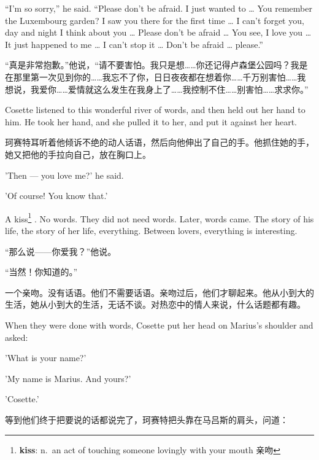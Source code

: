 \documentclass[fontset=ubuntu, zihao=5]{ctexart}
\begin{document}
\begin{paracol}{2}
\switchcolumn*

``I'm so sorry,'' he said. ``Please don't be afraid. I just wanted to \ldots{} You remember the Luxembourg garden? I saw you there for the first time \ldots{} I can't forget you, day and night I think about you \ldots{} Please don't be afraid \ldots{} You see, I love you \ldots{} It just happened to me \ldots{} I can't stop it \ldots{} Don't be afraid \ldots{} please.''

\switchcolumn

“真是非常抱歉。”他说，“请不要害怕。我只是想……你还记得卢森堡公园吗？我是在那里第一次见到你的……我忘不了你，日日夜夜都在想着你……千万别害怕……我想说，我爱你……爱情就这么发生在我身上了……我控制不住……别害怕……求求你。”

\switchcolumn*

Cosette listened to this wonderful river of words, and then held out her hand to him. He took her hand, and she pulled it to her, and put it against her heart.


\switchcolumn

珂赛特耳听着他倾诉不绝的动人话语，然后向他伸出了自己的手。他抓住她的手，她又把他的手拉向自己，放在胸口上。

\switchcolumn*

'Then --- you love me?' he said.

'Of course! You know that.'


A kiss\footnote{\textbf{kiss}: n. an act of touching someone lovingly with
  your mouth 亲吻} . No words. They did not need words. Later, words came.
The story of his life, the story of her life, everything. Between lovers,
everything is interesting.

\switchcolumn

“那么说——你爱我？”他说。

“当然！你知道的。”

一个亲吻。没有话语。他们不需要话语。亲吻过后，他们才聊起来。他从小到大的生活，她从小到大的生活，无话不谈。对热恋中的情人来说，什么话题都有趣。

\switchcolumn*

When they were done with words, Cosette put her head on Marius's shoulder and asked:


'What is your name?'


'My name is Marius. And yours?'


'Cosette.'

\switchcolumn

等到他们终于把要说的话都说完了，珂赛特把头靠在马吕斯的肩头，问道：


\end{paracol}
\end{document}
